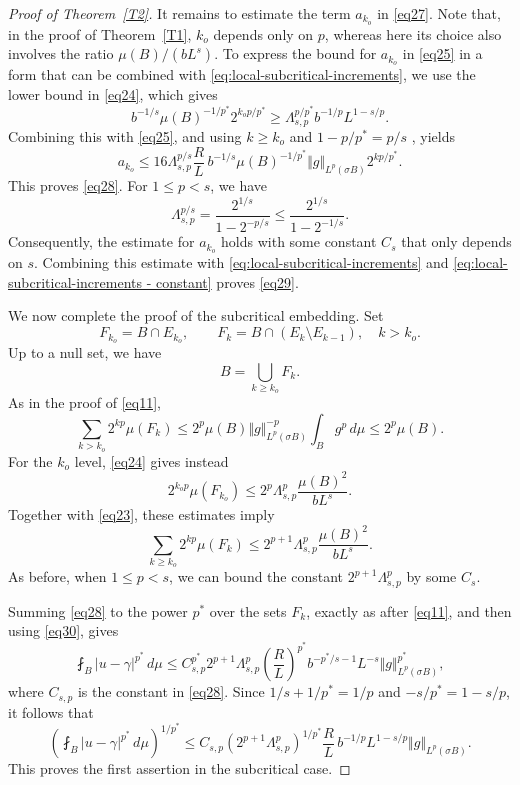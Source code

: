 \documentclass[12pt,leqno]{amsart}
\theoremstyle{definition}
\numberwithin{theorem}{section} \numberwithin{equation}{section}
\begin{document}
\begin{proof}[Proof of Theorem~\ref{T2}]
It remains to estimate the term $a_{k_o}$ in \eqref{eq27}.
Note that, in the proof of Theorem~\ref{T1}, $k_o$ depends only on $p$,
whereas here its choice also involves the ratio $\mu(B)/(bL^s)$.
To express the bound for $a_{k_o}$ in \eqref{eq25} in a form
that can be combined with \eqref{eq:local-subcritical-increments},
we use the lower bound in \eqref{eq24}, which gives
\[
 b^{-1/s}\mu(B)^{-1/p^*}2^{k_op/p^*}
 \geq \Lambda_{s,p}^{p/p^*}b^{-1/p}L^{1-s/p}.
\]
Combining this with \eqref{eq25}, and using $k\geq k_o$ and 
$1-p/p^*=p/s$%
, yields
\[
 a_{k_o}\leq 16\Lambda_{s,p}^{p/s}\frac RL\,b^{-1/s}\mu(B)^{-1/p^*}
 \Vert g\Vert_{L^p(\sigma B)}2^{kp/p^*}.
\]
This proves \eqref{eq28}. 
For $1\leq p<s$, we have
\[
 \Lambda_{s,p}^{p/s}
 =\frac{2^{1/s}}{1-2^{-p/s}}
 \leq\frac{2^{1/s}}{1-2^{-1/s}}.
\]
Consequently, the estimate for $a_{k_o}$ holds with some constant $C_s$
that only depends on $s$.
Combining this estimate with
\eqref{eq:local-subcritical-increments} and
\eqref{eq:local-subcritical-increments - constant}
proves \eqref{eq29}.



We now complete the proof of the subcritical embedding. Set
\begin{equation}
\label{eq:F sets}
F_{k_o}=B\cap E_{k_o},
 \qquad
 F_k=B\cap(E_k\setminus E_{k-1}),\quad k>k_o.
\end{equation}
Up to a null set, we have
\[
B=\bigcup_{k\geq k_o}F_k.
\]
 As in the proof of
\eqref{eq11},
\[
 \sum_{k>k_o}2^{kp}\mu(F_k)
 \leq 2^p\mu(B)\Vert g\Vert_{L^p(\sigma B)}^{-p}
       \int_B g^p\,d\mu
 \leq 2^p\mu(B).
\]
For the $k_o$ level, \eqref{eq24} gives instead
\[
 2^{k_op}\mu(F_{k_o})
 \leq 2^p\Lambda_{s,p}^p\frac{\mu(B)^2}{bL^s}.
\]
Together with \eqref{eq23}, these estimates imply
%
\begin{equation}
\label{eq30}
 \sum_{k\geq k_o}2^{kp}\mu(F_k)
 \leq 2^{p+1}\Lambda_{s,p}^p\frac{\mu(B)^2}{bL^s}.
\end{equation}
As before, when $1\leq p<s$, we can bound the constant $2^{p+1}\Lambda_{s,p}^p$ by some $C_s$.


Summing \eqref{eq28} to the power $p^*$ over the sets $F_k$, exactly as
after \eqref{eq11}, and then using \eqref{eq30}, gives
\[
 \fint_B |u-\gamma|^{p^*}\,d\mu
 \leq C_{s,p}^{p^*}2^{p+1}\Lambda_{s,p}^p\left(\frac RL\right)^{p^*}
 b^{-p^*/s-1}L^{-s}\Vert g\Vert_{L^p(\sigma B)}^{p^*},
\]
where $C_{s,p}$ is the constant in \eqref{eq28}.
Since $1/s+1/p^*=1/p$ and $-s/p^*=1-s/p$, it follows that
\[
 \left(\fint_B|u-\gamma|^{p^*}\,d\mu\right)^{1/p^*}
 \leq C_{s,p}\left(2^{p+1}\Lambda_{s,p}^p\right)^{1/p^*}\frac RL\,b^{-1/p}L^{1-s/p}
 \Vert g\Vert_{L^p(\sigma B)}.
\]
This proves the first assertion in the subcritical case.


\end{proof}
\end{document}
